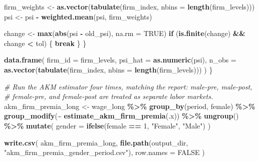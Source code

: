 \documentclass[
]{article}
\newenvironment{Shaded}{\begin{snugshade}}{\end{snugshade}}
\newcommand{\AttributeTok}[1]{\textcolor[rgb]{0.13,0.29,0.53}{#1}}
\newcommand{\CommentTok}[1]{\textcolor[rgb]{0.56,0.35,0.01}{\textit{#1}}}
\newcommand{\ConstantTok}[1]{\textcolor[rgb]{0.56,0.35,0.01}{#1}}
\newcommand{\ControlFlowTok}[1]{\textcolor[rgb]{0.13,0.29,0.53}{\textbf{#1}}}
\newcommand{\DecValTok}[1]{\textcolor[rgb]{0.00,0.00,0.81}{#1}}
\newcommand{\FunctionTok}[1]{\textcolor[rgb]{0.13,0.29,0.53}{\textbf{#1}}}
\newcommand{\NormalTok}[1]{#1}
\newcommand{\OtherTok}[1]{\textcolor[rgb]{0.56,0.35,0.01}{#1}}
\newcommand{\SpecialCharTok}[1]{\textcolor[rgb]{0.81,0.36,0.00}{\textbf{#1}}}
\newcommand{\StringTok}[1]{\textcolor[rgb]{0.31,0.60,0.02}{#1}}
\begin{document}
\begin{Shaded}
\begin{Highlighting}[]
\NormalTok{        firm\_weights }\OtherTok{\textless{}{-}} \FunctionTok{as.vector}\NormalTok{(}\FunctionTok{tabulate}\NormalTok{(firm\_index, }\AttributeTok{nbins =} \FunctionTok{length}\NormalTok{(firm\_levels)))}
\NormalTok{        psi }\OtherTok{\textless{}{-}}\NormalTok{ psi }\SpecialCharTok{{-}} \FunctionTok{weighted.mean}\NormalTok{(psi, firm\_weights)}

\NormalTok{        change }\OtherTok{\textless{}{-}} \FunctionTok{max}\NormalTok{(}\FunctionTok{abs}\NormalTok{(psi }\SpecialCharTok{{-}}\NormalTok{ old\_psi), }\AttributeTok{na.rm =} \ConstantTok{TRUE}\NormalTok{)}
        \ControlFlowTok{if}\NormalTok{ (}\FunctionTok{is.finite}\NormalTok{(change) }\SpecialCharTok{\&\&}\NormalTok{ change }\SpecialCharTok{\textless{}}\NormalTok{ tol) \{}
            \ControlFlowTok{break}
\NormalTok{        \}}
\NormalTok{    \}}

    \FunctionTok{data.frame}\NormalTok{(}
        \AttributeTok{firm\_id =}\NormalTok{ firm\_levels,}
        \AttributeTok{psi\_hat =} \FunctionTok{as.numeric}\NormalTok{(psi),}
        \AttributeTok{n\_obs =} \FunctionTok{as.vector}\NormalTok{(}\FunctionTok{tabulate}\NormalTok{(firm\_index, }\AttributeTok{nbins =} \FunctionTok{length}\NormalTok{(firm\_levels)))}
\NormalTok{    )}
\NormalTok{\}}

\CommentTok{\# Run the AKM estimator four times, matching the report: male{-}pre, male{-}post,}
\CommentTok{\# female{-}pre, and female{-}post are treated as separate labor markets.}
\NormalTok{akm\_firm\_premia\_long }\OtherTok{\textless{}{-}}\NormalTok{ wage\_long }\SpecialCharTok{\%\textgreater{}\%}
    \FunctionTok{group\_by}\NormalTok{(period, female) }\SpecialCharTok{\%\textgreater{}\%}
    \FunctionTok{group\_modify}\NormalTok{(}\SpecialCharTok{\textasciitilde{}} \FunctionTok{estimate\_akm\_firm\_premia}\NormalTok{(.x)) }\SpecialCharTok{\%\textgreater{}\%}
    \FunctionTok{ungroup}\NormalTok{() }\SpecialCharTok{\%\textgreater{}\%}
    \FunctionTok{mutate}\NormalTok{(}
        \AttributeTok{gender =} \FunctionTok{ifelse}\NormalTok{(female }\SpecialCharTok{==} \DecValTok{1}\NormalTok{, }\StringTok{"Female"}\NormalTok{, }\StringTok{"Male"}\NormalTok{)}
\NormalTok{    )}

\FunctionTok{write.csv}\NormalTok{(}
\NormalTok{    akm\_firm\_premia\_long,}
    \FunctionTok{file.path}\NormalTok{(output\_dir, }\StringTok{"akm\_firm\_premia\_gender\_period.csv"}\NormalTok{),}
    \AttributeTok{row.names =} \ConstantTok{FALSE}
\NormalTok{)}


\end{Highlighting}
\end{Shaded}
\end{document}
